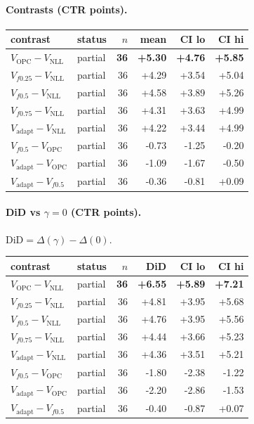 \documentclass[10pt,a4paper]{article}
\begin{document}
\paragraph{Contrasts (CTR points).}
{\centering\small\begin{tabular}{llrrrr}
\toprule contrast & status & $n$ & mean & CI lo & CI hi \\
\midrule
\textbf{$V_{\mathrm{OPC}}-V_{\mathrm{NLL}}$} & partial & \textbf{36} & \textbf{+5.30} & \textbf{+4.76} & \textbf{+5.85} \\
$V_{f0.25}-V_{\mathrm{NLL}}$ & partial & 36 & +4.29 & +3.54 & +5.04 \\
$V_{f0.5}-V_{\mathrm{NLL}}$ & partial & 36 & +4.58 & +3.89 & +5.26 \\
$V_{f0.75}-V_{\mathrm{NLL}}$ & partial & 36 & +4.31 & +3.63 & +4.99 \\
$V_{\mathrm{adapt}}-V_{\mathrm{NLL}}$ & partial & 36 & +4.22 & +3.44 & +4.99 \\
$V_{f0.5}-V_{\mathrm{OPC}}$ & partial & 36 & -0.73 & -1.25 & -0.20 \\
$V_{\mathrm{adapt}}-V_{\mathrm{OPC}}$ & partial & 36 & -1.09 & -1.67 & -0.50 \\
$V_{\mathrm{adapt}}-V_{f0.5}$ & partial & 36 & -0.36 & -0.81 & +0.09 \\
\bottomrule\end{tabular}\par}
\paragraph{DiD vs $\gamma=0$ (CTR points).} $\mathrm{DiD}=\Delta(\gamma)-\Delta(0)$.
{\centering\small\begin{tabular}{llrrrr}
\toprule contrast & status & $n$ & DiD & CI lo & CI hi \\
\midrule
\textbf{$V_{\mathrm{OPC}}-V_{\mathrm{NLL}}$} & partial & \textbf{36} & \textbf{+6.55} & \textbf{+5.89} & \textbf{+7.21} \\
$V_{f0.25}-V_{\mathrm{NLL}}$ & partial & 36 & +4.81 & +3.95 & +5.68 \\
$V_{f0.5}-V_{\mathrm{NLL}}$ & partial & 36 & +4.76 & +3.95 & +5.56 \\
$V_{f0.75}-V_{\mathrm{NLL}}$ & partial & 36 & +4.44 & +3.66 & +5.23 \\
$V_{\mathrm{adapt}}-V_{\mathrm{NLL}}$ & partial & 36 & +4.36 & +3.51 & +5.21 \\
$V_{f0.5}-V_{\mathrm{OPC}}$ & partial & 36 & -1.80 & -2.38 & -1.22 \\
$V_{\mathrm{adapt}}-V_{\mathrm{OPC}}$ & partial & 36 & -2.20 & -2.86 & -1.53 \\
$V_{\mathrm{adapt}}-V_{f0.5}$ & partial & 36 & -0.40 & -0.87 & +0.07 \\
\bottomrule\end{tabular}\par}
\bigskip
\newpage
\end{document}
